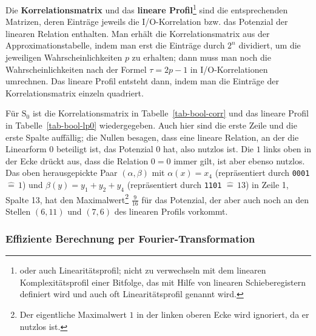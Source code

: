 \begin{refsegment}
Die \textbf{Korrelationsmatrix} und das
\textbf{lineare Profil}\footnote{%
   oder auch Linearitätsprofil; nicht zu verwechseln
   mit dem linearen
   Komplexitätsprofil einer
   Bitfolge, das mit Hilfe von linearen Schieberegistern
   definiert wird und auch oft Linearitätsprofil genannt wird.
   }
sind die entsprechenden Matrizen, deren Einträge
jeweils die I/O-Korrelation bzw. das
Potenzial der linearen Relation enthalten.
Man erhält die Korrelationsmatrix aus der
Approximationstabelle, indem man erst
die Einträge durch $2^n$ dividiert, um die jeweiligen Wahrscheinlichkeiten $p$
zu erhalten; dann muss man noch die Wahrscheinlichkeiten nach der Formel
$\tau = 2p - 1$ in I/O-Korrelationen umrechnen.
Das lineare Profil
entsteht dann, indem man die Einträge der
Korrelationsmatrix einzeln quadriert.

Für $\mathrm{S}_0$ ist die Korrelationsmatrix
in Tabelle~\ref{tab-bool-corr} und
das lineare Profil
in Tabelle~\ref{tab-bool-lp0} wiedergegeben. Auch hier sind
die erste Zeile und die erste Spalte auffällig; die Nullen besagen, dass
eine lineare Relation,
an der die Linearform $0$ beteiligt ist, das
Potenzial $0$ hat, also nutzlos ist. Die $1$ links oben in der Ecke
drückt aus, dass die Relation $0 = 0$ immer gilt, ist aber ebenso nutzlos.
Das oben herausgepickte
Paar $(\alpha,\beta)$ mit $\alpha(x) = x_4$ (repräsentiert durch \verb:0001: $\hat{=}\, 1$)
und $\beta(y) = y_1+y_2+y_4$ (repräsentiert durch \verb:1101: $\hat{=}\, 13$) in Zeile 1,
Spalte 13, hat den Maximalwert\footnote{%
  Der eigentliche Maximalwert $1$ in der linken oberen Ecke wird
  ignoriert, da er nutzlos ist.
} $\frac{9}{16}$ für das Potenzial, der aber auch noch
an den Stellen $(6,11)$ und $(7,6)$ des linearen Profils vorkommt.

\subsubsection*{Effiziente Berechnung per Fourier-Transformation}


\end{refsegment}
